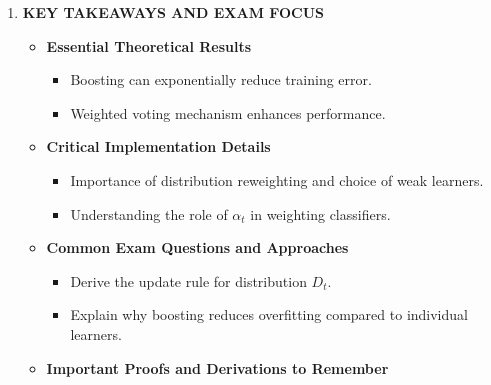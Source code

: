 \documentclass[
  12pt,
]{report}
\providecommand{\tightlist}{%
  \setlength{\itemsep}{0pt}\setlength{\parskip}{0pt}}
\begin{document}
\begin{enumerate}
\begin{itemize}
    \begin{itemize}
    \tightlist
    \item
      Boosting vs.~Bagging: Boosting often achieves lower bias, while bagging reduces variance.
    \item
      Boosting vs.~Single Learners: Typically outperforms single learners due to reduced overfitting.
    \end{itemize}
  \item
    \textbf{Limitations and Considerations in Practice}

    \begin{itemize}
    \tightlist
    \item
      Sensitive to noisy data and outliers.
    \item
      Requires careful selection of weak learners and hyperparameters.
    \end{itemize}
  \end{itemize}
\item
  \textbf{KEY TAKEAWAYS AND EXAM FOCUS}

  \begin{itemize}
  \tightlist
  \item
    \textbf{Essential Theoretical Results}

    \begin{itemize}
    \tightlist
    \item
      Boosting can exponentially reduce training error.
    \item
      Weighted voting mechanism enhances performance.
    \end{itemize}
  \item
    \textbf{Critical Implementation Details}

    \begin{itemize}
    \tightlist
    \item
      Importance of distribution reweighting and choice of weak learners.
    \item
      Understanding the role of \(\alpha_t\) in weighting classifiers.
    \end{itemize}
  \item
    \textbf{Common Exam Questions and Approaches}

    \begin{itemize}
    \tightlist
    \item
      Derive the update rule for distribution \(D_t\).
    \item
      Explain why boosting reduces overfitting compared to individual learners.
    \end{itemize}
  \item
    \textbf{Important Proofs and Derivations to Remember}


\end{itemize}
\end{enumerate}
\end{document}
